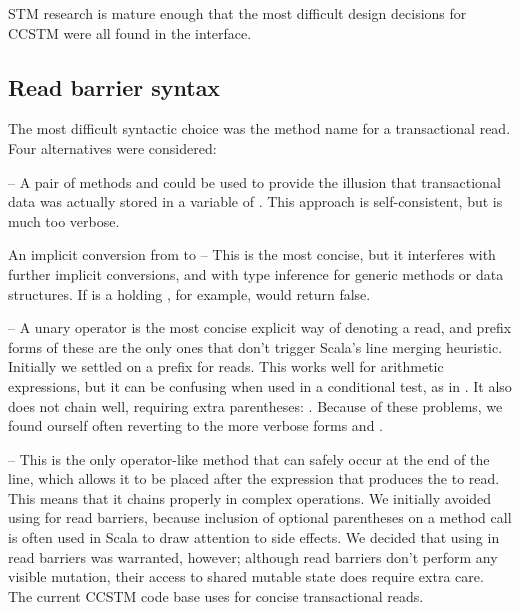 
STM research is mature enough that the most difficult design decisions
for CCSTM were all found in the interface.

\subsection{Read barrier syntax}
\label{sec:syntax}

The most difficult syntactic choice was the method name for a
transactional read.  Four alternatives were considered:

\begin{packed_enum}

\item {} -- A pair of methods  and 
could be used to provide the illusion that transactional data was actually
stored in a variable of .  This approach is self-consistent,
but is much too verbose.

\item An implicit conversion from  to  --
This is the most concise, but it interferes with further implicit
conversions, and with type inference for generic methods or data
structures.  If  is a  holding ,
for example,  would return false.

\item {} -- A unary operator is the most concise explicit
way of denoting a read, and prefix forms of these are the only ones
that don't trigger Scala's line merging heuristic.  Initially we
settled on a \code{!} prefix for reads.  This works well for arithmetic
expressions, but it can be confusing when used in a conditional test,
as in .  It also does not chain well, requiring
extra parentheses: .  Because of these problems, we
found ourself often reverting to the more verbose forms  and .

\item {} -- This is the only operator-like method that can
safely occur at the end of the line, which allows it to be placed after
the expression that produces the  to read.  This means that
it chains properly in complex operations.  We initially avoided using
 for read barriers, because inclusion of optional parentheses
on a method call is often used in Scala to draw attention to side effects.
We decided that using \code{()} in read barriers was warranted, however;
although read barriers don't perform any visible mutation, their access
to shared mutable state does require extra care.  The current CCSTM code
base uses  for concise transactional reads.

\end{packed_enum}

